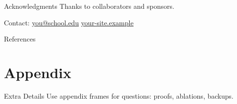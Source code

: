 \documentclass[10pt,aspectratio=169]{beamer}
\theoremstyle{definition}
\theoremstyle{plain}
\theoremstyle{remark}
\begin{document}
	\begin{frame}{Acknowledgments}
		\small
		Thanks to collaborators and sponsors. \par
		Contact: \href{mailto:you@school.edu}{you@school.edu} \quad
		\href{https://your-site.example}{your-site.example}
	\end{frame}
	
	\begin{frame}[allowframebreaks]{References}
		\printbibliography
	\end{frame}
	
	\appendix
	\section{Appendix}
	
	\begin{frame}{Extra Details}
		Use appendix frames for questions: proofs, ablations, backups.
	\end{frame}
	
\end{document}
